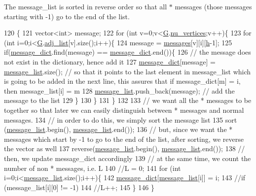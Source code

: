 The message\+\_\+list is sorted in reverse order so that all $\ast$ messages (those messages starting with -\/1) go to the end of the list. 
\begin{DoxyCode}
120 \{
121   vector<int> message;
122   \textcolor{keywordflow}{for} (\textcolor{keywordtype}{int} v=0;v<\hyperlink{classgraph__message_abffce6d6a7868da0e747425569759f0f}{G}.\hyperlink{classmarked__graph_acf79c6aeb8f32614cb14a5baaa6c9f9b}{nu\_vertices};v++)\{
123     \textcolor{keywordflow}{for} (\textcolor{keywordtype}{int} i=0;i<\hyperlink{classgraph__message_abffce6d6a7868da0e747425569759f0f}{G}.\hyperlink{classmarked__graph_a1a0bf7ca413a278763f7c878b3b6fd6f}{adj\_list}[v].size();i++)\{
124       message = \hyperlink{classgraph__message_a06a1d1ab91b4891c65ea80205566f800}{messages}[v][i][\hyperlink{classgraph__message_a934d63ed7275c211e13c6fb68824ed46}{h}-1];
125       \textcolor{keywordflow}{if}(\hyperlink{classgraph__message_a7890d2dff06b9de6f98734c69d8fbcfd}{message\_dict}.find(message) == \hyperlink{classgraph__message_a7890d2dff06b9de6f98734c69d8fbcfd}{message\_dict}.end())\{
126         \textcolor{comment}{// the message does not exist in the dictionary, hence add it}
127         \hyperlink{classgraph__message_a7890d2dff06b9de6f98734c69d8fbcfd}{message\_dict}[message] = \hyperlink{classgraph__message_aa497f561e976cf58cc554a77e0601d8f}{message\_list}.size(); \textcolor{comment}{// so that it points to the
       last element in message\_list which is going to be added in the next line, this assures that if message\_dict[m]
       = i, then message\_list[i] = m}
128         \hyperlink{classgraph__message_aa497f561e976cf58cc554a77e0601d8f}{message\_list}.push\_back(message); \textcolor{comment}{// add the message to the list}
129       \}
130     \}
131   \}
132 
133   \textcolor{comment}{// we want all the * messages to be together so that later we can easily distinguish between * messages
       and normal messages.}
134   \textcolor{comment}{// in order to do this, we simply sort the message list}
135   sort (\hyperlink{classgraph__message_aa497f561e976cf58cc554a77e0601d8f}{message\_list}.begin(), \hyperlink{classgraph__message_aa497f561e976cf58cc554a77e0601d8f}{message\_list}.end());
136   \textcolor{comment}{// but, since we want the * messages which start by -1 to go to the end of the list, after sorting, we
       reverse the vector as well}
137   reverse(\hyperlink{classgraph__message_aa497f561e976cf58cc554a77e0601d8f}{message\_list}.begin(), \hyperlink{classgraph__message_aa497f561e976cf58cc554a77e0601d8f}{message\_list}.end());
138   \textcolor{comment}{// then, we update message\_dict accordingly}
139   \textcolor{comment}{// at the same time, we count the number of non * messages, i.e. L}
140   \textcolor{comment}{//L = 0;}
141   \textcolor{keywordflow}{for} (\textcolor{keywordtype}{int} i=0;i<\hyperlink{classgraph__message_aa497f561e976cf58cc554a77e0601d8f}{message\_list}.size();i++)\{
142     \hyperlink{classgraph__message_a7890d2dff06b9de6f98734c69d8fbcfd}{message\_dict}[\hyperlink{classgraph__message_aa497f561e976cf58cc554a77e0601d8f}{message\_list}[i]] = i;
143     \textcolor{comment}{//if (message\_list[i][0] != -1)}
144     \textcolor{comment}{//L++;}
145   \}
146 \}
\end{DoxyCode}
